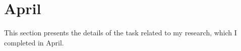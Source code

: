 \chapter{April}
\label{chap:Apr}


This section presents the details of the task related to my research, which I completed in April.



% 
% 
% 
